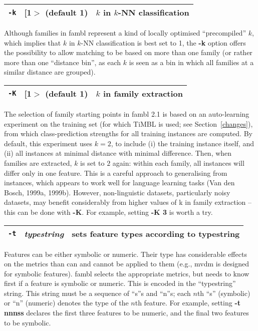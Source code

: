 \documentclass[11pt]{article}
\begin{document}
\begin{tabular}{|p{}|p{}|p{}|}
\hline
{\tt -k} & [1$>$ (default 1) & $k$ in $k$-NN classification \\
\hline
\end{tabular}

Although families in {\sc fambl} represent a kind of locally optimised
``precompiled'' $k$, which implies that $k$ in $k$-NN classification
is best set to 1, the {\bf -k} option offers the possibility to allow
matching to be based on more than one family (or rather more than one
``distance bin'', as each $k$ is seen as a bin in which all families
at a similar distance are grouped). 
\ \\

\begin{tabular}{|p{}|p{}|p{}|}
\hline
{\tt -K} & [1$>$ (default 1) & $k$ in family extraction \\
\hline
\end{tabular}

The selection of family starting points in {\sc fambl} 2.1 is based on
an auto-learning experiment on the training set (for which TiMBL is
used; see Section~\ref{changes}), from which class-prediction
strengths for all training instances are computed. By default, this
experiment uses $k=2$, to include (i) the training instance itself,
and (ii) all instances at minimal distance with minimal
difference. Then, when families are extracted, $k$ is set to
$2$ again: within each family, all instances will differ only in one
feature. This is a careful approach to generalising from instances,
which appears to work well for language learning tasks (Van den Bosch,
1999a, 1999b). However, non-linguistic datasets, particularly noisy
datasets, may benefit considerably from higher values of k in family
extraction -- this can be done with {\bf -K}. For example, setting
{\bf -K 3} is worth a try.
\ \\

\begin{tabular}{|p{}|p{}|p{}|}
\hline
{\tt -t} & {\sl typestring} & sets feature types according to typestring \\
\hline
\end{tabular}

Features can be either symbolic or numeric. Their type has
considerable effects on the metrics than can and cannot be applied to
them (e.g., {\sc mvdm} is designed for symbolic features). {\sc fambl}
selects the appropriate metrics, but needs to know first if a feature
is symbolic or numeric. This is encoded in the ``typestring''
string. This string must be a sequence of ``s''s and ``n''s; each
$n$th ``s'' (symbolic) or ``n'' (numeric) denotes the type of the
$n$th feature. For example, setting {\bf -t nnnss} declares the first
three features to be numeric, and the final two features to be
symbolic. 
\ \\
\end{document}
